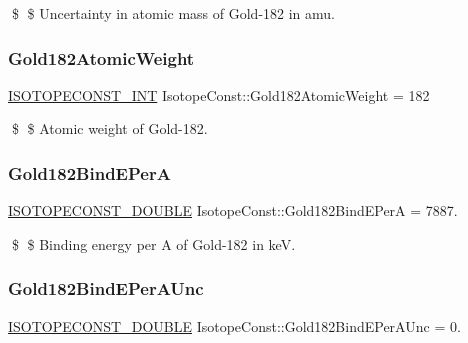 \$ \$ Uncertainty in atomic mass of Gold-\/182 in amu. \mbox{\label{group___isotope_const-_gold-_au182_ga942e20968891ea2842021d5ec5ab4843}} 
\subsubsection{\texorpdfstring{Gold182\+Atomic\+Weight}{Gold182AtomicWeight}}
{\footnotesize\ttfamily \mbox{\hyperlink{group___isotope_const-_macros_ga5f18360b3e99483a35c32d789e62621c}{I\+S\+O\+T\+O\+P\+E\+C\+O\+N\+S\+T\+\_\+\+I\+NT}} Isotope\+Const\+::\+Gold182\+Atomic\+Weight = 182}

\$ \$ Atomic weight of Gold-\/182. \mbox{\label{group___isotope_const-_gold-_au182_ga1fcff48a376034dd3707259dd27b9574}} 
\subsubsection{\texorpdfstring{Gold182\+Bind\+E\+PerA}{Gold182BindEPerA}}
{\footnotesize\ttfamily \mbox{\hyperlink{group___isotope_const-_macros_ga8f45a7272ce02c0b4c65c44636ed719a}{I\+S\+O\+T\+O\+P\+E\+C\+O\+N\+S\+T\+\_\+\+D\+O\+U\+B\+LE}} Isotope\+Const\+::\+Gold182\+Bind\+E\+PerA = 7887.}

\$ \$ Binding energy per A of Gold-\/182 in keV. \mbox{\label{group___isotope_const-_gold-_au182_ga2e5e469e697bce3b699dc24f8f090c43}} 
\subsubsection{\texorpdfstring{Gold182\+Bind\+E\+Per\+A\+Unc}{Gold182BindEPerAUnc}}
{\footnotesize\ttfamily \mbox{\hyperlink{group___isotope_const-_macros_ga8f45a7272ce02c0b4c65c44636ed719a}{I\+S\+O\+T\+O\+P\+E\+C\+O\+N\+S\+T\+\_\+\+D\+O\+U\+B\+LE}} Isotope\+Const\+::\+Gold182\+Bind\+E\+Per\+A\+Unc = 0.}

